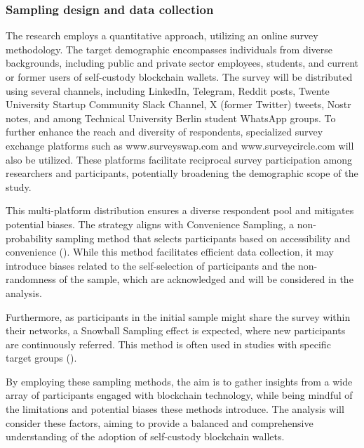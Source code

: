 \documentclass[twocolumn]{article}
\begin{document}
\subsubsection{Sampling design and data collection}

The research employs a quantitative approach, utilizing an online survey methodology. The target demographic encompasses individuals from diverse backgrounds, including public and private sector employees, students, and current or former users of self-custody blockchain wallets. The survey will be distributed using several channels, including LinkedIn, Telegram, Reddit posts, Twente University Startup Community Slack Channel, X (former Twitter) tweets, Nostr notes, and among Technical University Berlin student WhatsApp groups. To further enhance the reach and diversity of respondents, specialized survey exchange platforms such as www.surveyswap.com and www.surveycircle.com will also be utilized. These platforms facilitate reciprocal survey participation among researchers and participants, potentially broadening the demographic scope of the study.

This multi-platform distribution ensures a diverse respondent pool and mitigates potential biases. The strategy aligns with Convenience Sampling, a non-probability sampling method that selects participants based on accessibility and convenience (\cite{lavrakas_nonprobability_2008}). While this method facilitates efficient data collection, it may introduce biases related to the self-selection of participants and the non-randomness of the sample, which are acknowledged and will be considered in the analysis.

Furthermore, as participants in the initial sample might share the survey within their networks, a Snowball Sampling effect is expected, where new participants are continuously referred. This method is often used in studies with specific target groups (\cite{goodman_snowball_1961}). 

By employing these sampling methods, the aim is to gather insights from a wide array of participants engaged with blockchain technology, while being mindful of the limitations and potential biases these methods introduce. The analysis will
consider these factors, aiming to provide a balanced and comprehensive understanding of the adoption of self-custody blockchain wallets.
\end{document}
